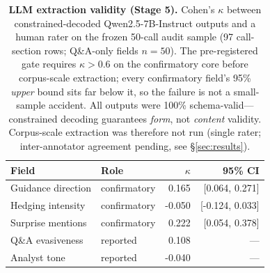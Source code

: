 \begin{table}[t]
\centering
\small
\begin{tabular}{llrr}
\toprule
Field & Role & $\kappa$ & 95\% CI \\
\midrule
Guidance direction & confirmatory & 0.165 & [0.064, 0.271] \\
Hedging intensity  & confirmatory & -0.050 & [-0.124, 0.033] \\
Surprise mentions  & confirmatory & 0.222 & [0.054, 0.378] \\
Q\&A evasiveness   & reported     & 0.108 & --- \\
Analyst tone       & reported     & -0.040 & --- \\
\bottomrule
\end{tabular}
\caption{\textbf{LLM extraction validity (Stage 5).} Cohen's $\kappa$ between
constrained-decoded Qwen2.5-7B-Instruct outputs and a human rater on the frozen
50-call audit sample (97 call-section rows; Q\&A-only fields $n{=}50$). The
pre-registered gate requires $\kappa>0.6$ on the confirmatory core before
corpus-scale extraction; every confirmatory field's 95\% \emph{upper} bound sits far
below it, so the failure is not a small-sample accident. All outputs were 100\%
schema-valid---constrained decoding guarantees \emph{form}, not \emph{content}
validity. Corpus-scale extraction was therefore not run (single rater;
inter-annotator agreement pending, see \S\ref{sec:results}).}
\label{tab:llmkappa}
\end{table}
